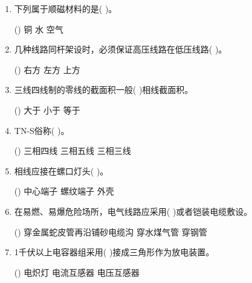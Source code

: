 \begin{enumerate}
				\item
				下列属于顺磁材料的是( )。
					\begin{tasks}(\choosenum)
						\task 铜
						\task 水
						\task 空气
					\end{tasks} \daan{C}{}


				
				\item 几种线路同杆架设时，必须保证高压线路在低压线路( )。
					\begin{tasks}(\choosenum)
						\task 右方
						\task 左方
						\task 上方
					\end{tasks} 


				
				\item 三线四线制的零线的截面积一般( )相线截面积。
					\begin{tasks}(\choosenum)
						\task 大于
						\task 小于
						\task 等于
					\end{tasks} \daan{B}{}


				
				\item TN-S俗称( )。
					\begin{tasks}(\choosenum)
						\task 三相四线
						\task 三相五线
						\task 三相三线
					\end{tasks} \daan{B}{}


				
				\item 相线应接在螺口灯头( )。
					\begin{tasks}(\choosenum)
						\task 中心端子
						\task 螺纹端子
						\task 外壳
					\end{tasks} \daan{A}{}

				\item 在易燃、易爆危险场所，电气线路应采用( )或者铠装电缆敷设。
					\begin{tasks}(\choosenum)
						\task 穿金属蛇皮管再沿铺砂电缆沟
						\task 穿水煤气管
						\task 穿钢管
					\end{tasks} 

			\item 1千伏以上电容器组采用( )接成三角形作为放电装置。
					\begin{tasks}(\choosenum)
						\task 电炽灯
						\task 电流互感器
						\task 电压互感器
					\end{tasks} \daan{C}{}







	\end{enumerate}





